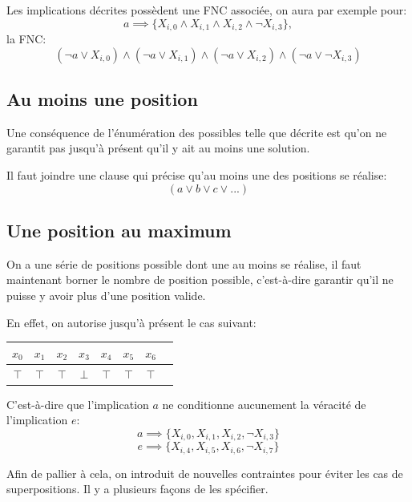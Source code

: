 \documentclass[a4paper,12pt]{report}
\newcommand\black{\cellcolor{black}}
\begin{document}
Les implications décrites possèdent une FNC associée, on aura par exemple pour:
$$a \implies \{X_{i,0} \wedge X_{i,1} \wedge X_{i,2} \wedge \lnot X_{i,3}\},$$
la FNC:
$$(\lnot a \vee X_{i,0}) \wedge ( \lnot a \vee X_{i,1}) \wedge ( \lnot a \vee X_{i,2}) \wedge (\lnot a \vee \lnot X_{i,3})$$
\subsection{Au moins une position}
Une conséquence de l'énumération des possibles telle que décrite est qu'on ne garantit pas jusqu'à présent qu'il y ait au moins une solution.

Il faut joindre une clause qui précise qu'au moins une des positions se réalise:
$$(a \vee b \vee c \vee ...)$$

\subsection{Une position au maximum}
On a une série de positions possible dont une au moins se réalise, il faut maintenant borner le nombre de position possible, c'est-à-dire garantir qu'il ne puisse y avoir plus d'une position valide.

En effet, on autorise jusqu'à présent le cas suivant:
\begin{center}
\begin{tabular}{|c|c|c|c|c|c|c|c|}
	\hline
	$x_{0}$ & $x_{1}$ & $x_{2}$ & $x_{3}$ & $x_{4}$ & $x_{5}$& $x_{6}$\\	
	\hline
	\black \color{white}$\top$ & \black \color{white}$\top$  & \black \color{white}$\top$  
	& $\bot$ & 	
	\black \color{white}$\top$ & \black \color{white}$\top$  & \black \color{white}$\top$  \\ 			
	\hline
\end{tabular}
\end{center}
C'est-à-dire que l'implication $a$ ne conditionne aucunement la véracité de l'implication $e$:
$$a \implies \{X_{i,0},X_{i,1},X_{i,2},\lnot X_{i,3}\}$$
$$e \implies \{X_{i,4},X_{i,5},X_{i,6},\lnot X_{i,7}\}$$

Afin de pallier à cela, on introduit de nouvelles contraintes pour éviter les cas de superpositions. Il y a plusieurs façons de les spécifier.
\end{document}
